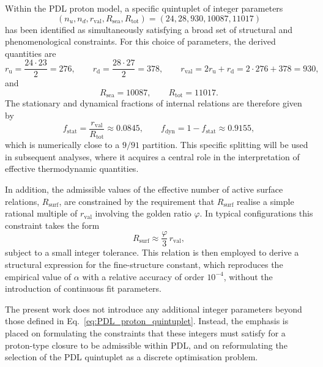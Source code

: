 \documentclass[11pt,a4paper]{article}
\theoremstyle{definition}
\begin{document}
Within the PDL proton model, a specific quintuplet of integer parameters
\begin{equation}
 (n_u,n_d,r_{\mathrm{val}},R_{\mathrm{sea}},R_{\mathrm{tot}}) = (24,28,930,10087,11017)
 \label{eq:PDL_proton_quintuplet}
\end{equation}
has been identified as simultaneously satisfying a broad set of structural and phenomenological constraints.\cite{Combinatorial_Proton_v2_2026,PDL_Global_Mapping_2026} For this choice of parameters, the derived quantities are
\[
 r_{\mathrm{u}} = \frac{24\cdot 23}{2} = 276, \qquad
 r_{\mathrm{d}} = \frac{28\cdot 27}{2} = 378, \qquad
 r_{\mathrm{val}} = 2r_{\mathrm{u}} + r_{\mathrm{d}} = 2\cdot 276 + 378 = 930,
\]
and
\[
 R_{\mathrm{sea}} = 10087, \qquad R_{\mathrm{tot}} = 11017.
\]
The stationary and dynamical fractions of internal relations are therefore given by
\[
 f_{\mathrm{stat}} = \frac{r_{\mathrm{val}}}{R_{\mathrm{tot}}}
 \approx 0.0845, \qquad
 f_{\mathrm{dyn}} = 1 - f_{\mathrm{stat}} \approx 0.9155,
\]
which is numerically close to a $9/91$ partition. This specific splitting will be used in subsequent analyses, where it acquires a central role in the interpretation of effective thermodynamic quantities.\cite{Combinatorial_Proton_v2_2026,Alpha_PDL_v2_2026,Effective_Fields_PDL_2026}

In addition, the admissible values of the effective number of active surface relations, $R_{\mathrm{surf}}$, are constrained by the requirement that $R_{\mathrm{surf}}$ realise a simple rational multiple of $r_{\mathrm{val}}$ involving the golden ratio $\varphi$. In typical configurations this constraint takes the form
\begin{equation}
 R_{\mathrm{surf}} \approx \frac{\varphi}{3}\, r_{\mathrm{val}},
 \label{eq:Rsurf_scaling}
\end{equation}
subject to a small integer tolerance.\cite{Golden_Ratio_Sketch_2026,Alpha_PDL_v2_2026} This relation is then employed to derive a structural expression for the fine-structure constant, which reproduces the empirical value of $\alpha$ with a relative accuracy of order $10^{-4}$, without the introduction of continuous fit parameters.\cite{Alpha_PDL_v2_2026}

The present work does not introduce any additional integer parameters beyond those defined in Eq.~\eqref{eq:PDL_proton_quintuplet}. Instead, the emphasis is placed on formulating the constraints that these integers must satisfy for a proton-type closure to be admissible within PDL, and on reformulating the selection of the PDL quintuplet as a discrete optimisation problem.\cite{Combinatorial_Proton_v2_2026,PDL_Global_Mapping_2026}
\end{document}
